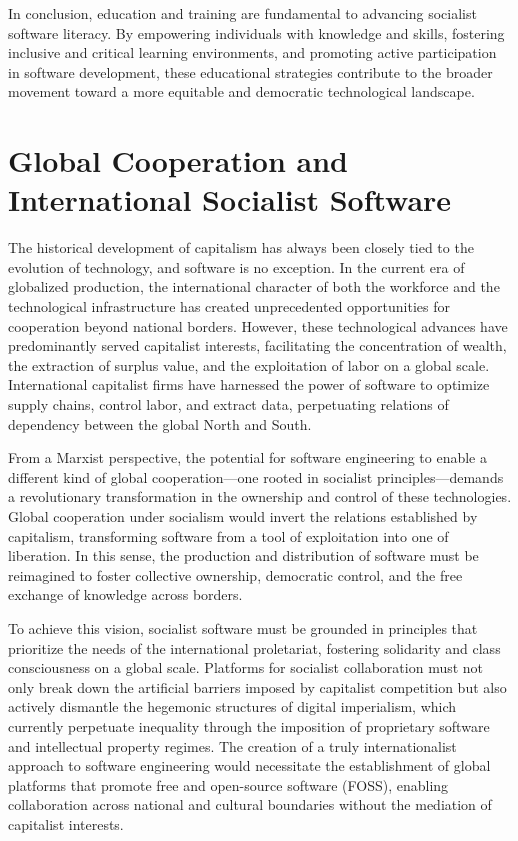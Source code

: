 \begin{refsection}
In conclusion, education and training are fundamental to advancing socialist software literacy. By empowering individuals with knowledge and skills, fostering inclusive and critical learning environments, and promoting active participation in software development, these educational strategies contribute to the broader movement toward a more equitable and democratic technological landscape.

\section{Global Cooperation and International Socialist Software}

The historical development of capitalism has always been closely tied to the evolution of technology, and software is no exception. In the current era of globalized production, the international character of both the workforce and the technological infrastructure has created unprecedented opportunities for cooperation beyond national borders. However, these technological advances have predominantly served capitalist interests, facilitating the concentration of wealth, the extraction of surplus value, and the exploitation of labor on a global scale. International capitalist firms have harnessed the power of software to optimize supply chains, control labor, and extract data, perpetuating relations of dependency between the global North and South.

From a Marxist perspective, the potential for software engineering to enable a different kind of global cooperation—one rooted in socialist principles—demands a revolutionary transformation in the ownership and control of these technologies. Global cooperation under socialism would invert the relations established by capitalism, transforming software from a tool of exploitation into one of liberation. In this sense, the production and distribution of software must be reimagined to foster collective ownership, democratic control, and the free exchange of knowledge across borders.

To achieve this vision, socialist software must be grounded in principles that prioritize the needs of the international proletariat, fostering solidarity and class consciousness on a global scale. Platforms for socialist collaboration must not only break down the artificial barriers imposed by capitalist competition but also actively dismantle the hegemonic structures of digital imperialism, which currently perpetuate inequality through the imposition of proprietary software and intellectual property regimes. The creation of a truly internationalist approach to software engineering would necessitate the establishment of global platforms that promote free and open-source software (FOSS), enabling collaboration across national and cultural boundaries without the mediation of capitalist interests.


\end{refsection}

